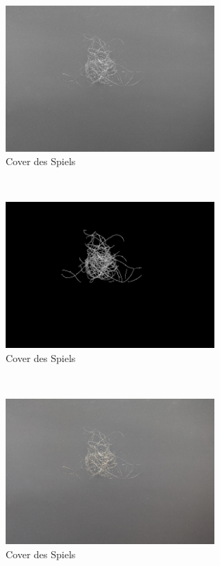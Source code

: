 \documentclass[german,a4paper,12pt,smallheadings,headsepline, titlepage, liststotoc, idextotoc,bibtoctoc,blibliography = totocnumbered]{scrartcl}
\begin{document}
\begin{figure}
	\centering
	\includegraphics[width=0.7\textwidth]{figBina/05inverted gray.png}
	\caption[]{Cover des Spiels}
	\label{img:Bina01}
\end{figure}\\
\begin{figure}
	\centering
	\includegraphics[width=0.7\textwidth]{figBina/06small regions removed.png}
	\caption[]{Cover des Spiels}
	\label{img:Bina01}
\end{figure}\\
\begin{figure}
	\centering
	\includegraphics[width=0.7\textwidth]{figBina/07orig.png}
	\caption[]{Cover des Spiels}
	\label{img:Bina01}
\end{figure}\\
\end{document}
